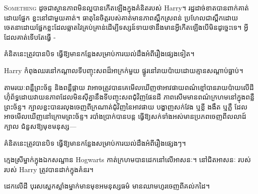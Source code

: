 
\lettrine{S}{omething} ដូច​ជា​ស្ថានភាព​មិន​ល្អ​បាន​កើត​ឡើង​ក្នុង​គំនិត​របស់ Harry។ រដ្ឋដាច់ខាតបានពាក់គាត់ដោយផ្នែក ខ្លះនៅជាមួយគាត់។ ធាតុនៃចិត្តរបស់គាត់មានភាពស្ពឹកស្រពន់ ប្រហែលជាស្ពឹកដោយចេតនាដោយផ្នែកខ្លះដែលឆ្លាតវៃគ្រប់គ្រាន់ដើម្បីទស្សន៍ទាយថានឹងមានអ្វីកើតឡើងបើមិនដូច្នេះទេ។ អ្វីដែលគាត់ទើបតែធ្វើ -

គំនិតនេះត្រូវបានបិទ ធ្វើឱ្យមានកន្លែងសម្រាប់ការយល់ដឹងអំពីរឿងផ្សេងទៀត។

Harry កំពុង​ឈរ​នៅ​កណ្តាល​ទី​បញ្ចុះសព​ដ៏​អាក្រក់​មួយ ផ្នូរ​នៅ​រាយប៉ាយ​ដោយ​គ្មាន​សណ្តាប់ធ្នាប់។

តាមរយៈពន្លឺព្រះច័ន្ទ និងពន្លឺផ្កាយ វាអាចត្រូវបានគេមើលឃើញថាអាវផាយពណ៌ខ្មៅបានរាយប៉ាយលើដី ហ៊ុំព័ទ្ធដោយវាយនភាពដែលមិនស៊ីគ្នានឹងទីបញ្ចុះសពជុំវិញផែនដី ភាពសើមមានពណ៌ក្រហមនៅក្នុងពន្លឺព្រះច័ន្ទ។ ក្បាលខ្លះបានរលុងចេញពីក្រណាត់ជុំវិញនៃអាវផាយ បង្ហាញសក់វែង ឬខ្លី ងងឹត ឬភ្លឺ ដែលអាចមើលឃើញនៅក្រោមព្រះច័ន្ទ។ របាំងប្រាក់បានបន្ត ធ្វើឱ្យសក់ទាំងអស់មានប្រភពចេញពីលលាដ៍ក្បាល ជំនួសឱ្យមុខមនុស្ស—

គំនិតនេះត្រូវបានបិទ ធ្វើឱ្យមានកន្លែងសម្រាប់ការយល់ដឹងអំពីរឿងផ្សេងៗ។

ក្មេងស្រីម្នាក់ក្នុងឯកសណ្ឋាន Hogwarts កាត់ក្រហមបានដេកនៅលើអាសនៈ។ នៅជិតអាសនៈ របស់របស់ Harry ត្រូវបានដាក់ក្នុងគំនរ។

ដេក​លើ​ដី បុរស​ស្លេក​ស្លាំង​ម្នាក់​មាន​មុខ​អមនុស្សធម៌ មាន​ឈាម​ហូរ​ចេញ​ពី​គល់​កដៃ។

